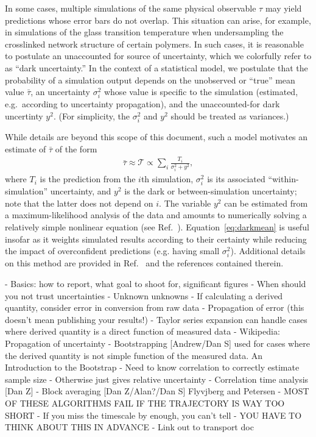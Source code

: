 In some cases, multiple simulations of the same physical observable $\tau$ may yield predictions whose error bars do not overlap.  This situation can arise, for example, in simulations of the glass transition temperature when undersampling the crosslinked network structure of certain polymers.  In such cases, it is reasonable to postulate an unaccounted for source of uncertainty, which we colorfully refer to as ``dark uncertainty.''  In the context of a statistical model, we postulate that the probability of a simulation output depends on the unobserved or ``true'' mean value $\bar \tau$, an uncertainty $\sigma_i^2$ whose value is specific to the simulation (estimated, e.g.\ according to uncertainty propagation), and the unaccounted-for dark uncertinty $y^2$.  (For simplicity, the $\sigma_i^2$ and $y^2$ should be treated as variances.)  

While details are beyond this scope of this document, such a model motivates an estimate of $\bar \tau$ of the form 
\begin{align}
\bar \tau \approx \mathcal T \propto \sum_i \frac{T_i}{\sigma_i^2 + y^2}, \label{eq:darkmean}
\end{align}
where $T_i$ is the prediction from the $i$th simulation, $\sigma_i^2$ is its associated ``within-simulation'' uncertainty, and $y^2$ is the dark or between-simulation uncertainty; note that the latter does not depend on $i$.  The variable $y^2$ can be estimated from a maximum-likelihood analysis of the data and amounts to numerically solving a relatively simple nonlinear equation (see Ref.~\cite{patrone1}).  Equation~\eqref{eq:darkmean} is useful insofar as it weights simulated results according to their certainty while reducing the impact of overconfident predictions (e.g. having small $\sigma_i^2$).  Additional details on this method are provided in Ref.~\cite{patrone1} and the references contained therein.



- Basics: how to report, what goal to shoot for, significant figures
- When should you not trust uncertainties
    - Unknown unknowns
- If calculating a derived quantity, consider error in conversion from raw data 
    - Propagation of error (this doesn’t mean publishing your results!)
    - Taylor series expansion can handle cases where derived quantity is a direct function of measured data
    - Wikipedia: Propagation of uncertainty
    - Bootstrapping [Andrew/Dan S]
used for cases where the derived quantity is not simple function of the measured data.
An Introduction to the Bootstrap
    - Need to know correlation to correctly estimate sample size
    - Otherwise just gives relative uncertainty
- Correlation time analysis [Dan Z]
- Block averaging [Dan Z/Alan?/Dan S] Flyvjberg and Petersen 
- MOST OF THESE ALGORITHMS FAIL IF THE TRAJECTORY IS WAY TOO SHORT
    - If you miss the timescale by enough, you can’t tell
    - YOU HAVE TO THINK ABOUT THIS IN ADVANCE
- Link out to transport doc
